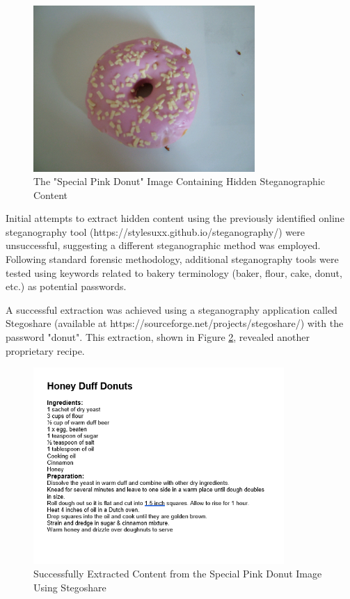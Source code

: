 \begin{figure}[h]
    \centering
    \includegraphics[width=0.75\textwidth]{images/Artifact and Evidence Recovery/SpecialPinkDonut_recipe.png}
    \caption{The "Special Pink Donut" Image Containing Hidden Steganographic Content}
    \label{fig:pink_donut}
\end{figure}

Initial attempts to extract hidden content using the previously identified online steganography tool (https://stylesuxx.github.io/steganography/) were unsuccessful, suggesting a different steganographic method was employed. Following standard forensic methodology, additional steganography tools were tested using keywords related to bakery terminology (baker, flour, cake, donut, etc.) as potential passwords.

A successful extraction was achieved using a steganography application called Stegoshare (available at https://sourceforge.net/projects/stegoshare/) with the password "donut". This extraction, shown in Figure \ref{fig:pink_donut_extract}, revealed another proprietary recipe.

\begin{figure}[h]
    \centering
    \includegraphics[width=0.85\textwidth]{images/Artifact and Evidence Recovery/SpecialPinkDonut_extract.png}
    \caption{Successfully Extracted Content from the Special Pink Donut Image Using Stegoshare}
    \label{fig:pink_donut_extract}
\end{figure}

